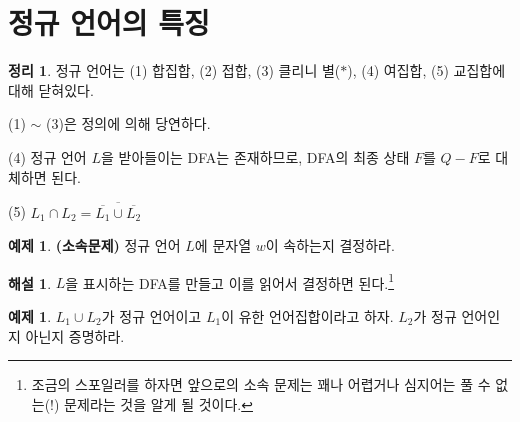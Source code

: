 \documentclass[b5paper, 11pt]{book}
\theoremstyle{definition}
\newtheorem{thm}[defn]{정리}
\newtheorem{ex}[defn]{예제}
\newtheorem*{ans*}{해설}
\newenvironment{pf*}{\pushQED{\qed}\pf}
{\popQED\endpf}
\begin{document}
\section{정규 언어의 특징}
\begin{thm}\label{RE feature}
정규 언어는 (1) 합집합, (2) 접합, (3) 클리니 별($*$), (4) 여집합, (5) 교집합에 대해 닫혀있다.
\end{thm}
\begin{pf*}
(1) $\sim$ (3)은 정의에 의해 당연하다.

(4) 정규 언어 $L$을 받아들이는 DFA는 존재하므로, DFA의 최종 상태 $F$를 $Q-F$로 대체하면 된다.

(5) $L_1 \cap L_2  = \overline{\overline{L_1} \cup \overline{L_2}}$
\end{pf*} 
\begin{ex}
    \textbf{(소속문제)} 정규 언어 $L$에 문자열 $w$이 속하는지 결정하라. 
\end{ex} 
\begin{ans*}
$L$을 표시하는 DFA를 만들고 이를 읽어서 결정하면 된다.\footnote{ 조금의 스포일러를 하자면 앞으로의 소속 문제는 꽤나 어렵거나 심지어는 풀 수 없는(!) 문제라는 것을 알게 될 것이다.}
\end{ans*}
\begin{ex}
    $L_1 \cup L_2$가 정규 언어이고 $L_1$이 유한 언어집합이라고 하자. $L_2$가
    정규 언어인지 아닌지 증명하라. 
\end{ex}
\end{document}
